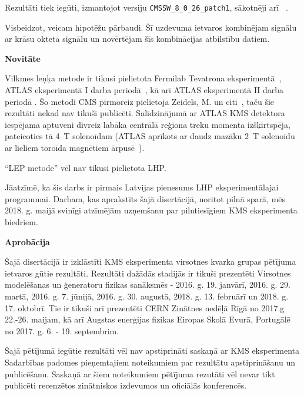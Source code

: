 Rezultāti tiek iegūti, izmantojot \CMSSW versiju \lstinline[language=sh]|CMSSW_8_0_26_patch1|, sākotnēji arī \RIVET~\cite{Buckley:2010ar}.

Visbeidzot, veicam hipotēžu pārbaudi. Šī uzdevuma ietvaros kombinējam \ttbar signālu ar krāsu okteta \PW signālu un novērtējam šīs kombinācijas atbilstību datiem.

\medskip
\textbf{Novitāte}
\nopagebreak\medskip

Vilkmes leņķa metode ir tikusi pielietota Fermilab Tevatrona \DZERO eksperimentā~\cite{Abazov:2011vh}, ATLAS eksperimentā I darba periodā~\cite{Aad:2015lxa}, kā arī ATLAS eksperimentā II darba periodā \cite{Aaboud:2018ibj}. Šo metodi CMS pirmoreiz pielietoja Zeidels, M. un citi~\cite{indico:Markus_cf}, taču šie rezultāti nekad nav tikuši publicēti. Salīdzinājumā ar ATLAS KMS detektora iespējama aptuveni divreiz labāka centrālā reģiona treku momenta izšķirtspēja, pateicoties tā 4~T solenoīdam (ATLAS aprīkots ar daudz mazāku 2~T solenoīdu ar lieliem toroīda magnētiem ārpusē~\cite{Aad:2008zzm}).

``LEP metode'' vēl nav tikusi pielietota LHP.

Jāatzīmē, ka šis darbs ir pirmais Latvijas pienesums LHP eksperimentālajai programmai. Darbam, kas aprakstīts šajā disertācijā, noritot pilnā sparā, mēs 2018. g. maijā svinīgi atzīmējām uzņemšanu par pilntiesīgiem KMS eksperimenta biedriem.

\medskip
\textbf{Aprobācija}
\nopagebreak\medskip


Šajā disertācijā ir izklāstīti KMS eksperimenta virsotnes kvarka grupas pētījuma ietvaros gūtie rezultāti. Rezultāti dažādās stadijās ir tikuši prezentēti Virsotnes modelēšanas un ģeneratoru fizikas sanāksmēs - 2016. g. 19. janvārī, 2016. g. 29. martā, 2016. g. 7. jūnijā, 2016. g. 30. augustā, 2018. g. 13. februārī un 2018. g. 17. oktobrī. Tie ir tikuši arī prezentēti CERN Zinātnes nedēļā Rīgā no 2017.g 22.-26. maijam, kā arī Augstas enerģijas fizikas Eiropas Skolā Evurā, Portugālē no 2017. g. 6. - 19. septembrim.

Šajā pētījumā iegūtie rezultāti vēl nav apstiprināti saskaņā ar KMS eksperimenta Sadarbības padomes pieņemtajiem noteikumiem par rezultātu apstiprināšanu un publicēšanu. Saskaņā ar šiem noteikumiem pētījuma rezutāti vēl nevar tikt publicēti recenzētos zinātniskos izdevumos un oficiālās konferencēs.

